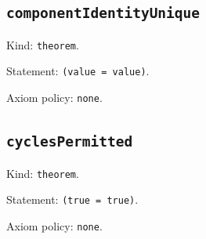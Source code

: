 \documentclass[11pt]{article}
\begin{document}
\subsection*{\texttt{componentIdentityUnique}}
\noindent Kind: \texttt{theorem}.\par
\noindent Statement: \texttt{(value = value)}.\par
\noindent Axiom policy: \texttt{none}.\par
\subsection*{\texttt{cyclesPermitted}}
\noindent Kind: \texttt{theorem}.\par
\noindent Statement: \texttt{(true = true)}.\par
\noindent Axiom policy: \texttt{none}.\par
\end{document}
